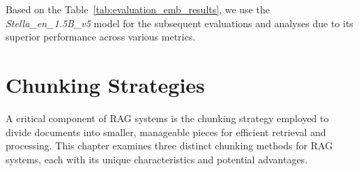\begin{table}[h!]
\noindent
{}\caption{Evaluation Results for Different Methods through the Pipeline (just with the Gemma2 model)}
\label{tab:evaluation_emb_results}
\end{table}

Based on the Table~\ref{tab:evaluation_emb_results}, we use the \textit{Stella\_en\_1.5B\_v5} model for the subsequent evaluations and analyses due to its superior performance across various metrics.

\section{Chunking Strategies}\label{sec:chunking-strategies}
A critical component of \ac{RAG} systems is the chunking strategy employed to divide documents into smaller, manageable pieces for efficient retrieval and processing.
This chapter examines three distinct chunking methods for \ac{RAG} systems, each with its unique characteristics and potential advantages.

